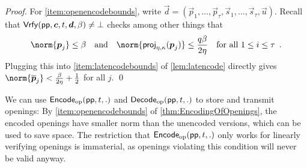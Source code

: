 \begin{proof}
\bigskip\noindent
For \autoref{item:openencodebounds}, write $\vec{d} = (\vec{p}_1,\ldots,\vec{p}_\tau,\vec{s}_1,\ldots, \vec{s}_\tau,\vec{u})$.
Recall that $\mathsf{Vrfy}(\mathsf{pp}, \boldsymbol{c},t,\boldsymbol{d},\beta) \neq \bot$ checks among other things that
\[
 \norm{\vec{p}_j} \leq \beta \quad\text{and}\quad \norm{\projring(\vec{p}_j)}\leq \frac{q\beta}{2\eta} \quad\text{for all $1\leq i \leq \tau$}\enspace.
\]
Plugging this into \autoref{item:latencodebounds} of \autoref{lem:latencode} directly gives $\norm{\overline{\vec{p}}_j} < \frac{\beta}{2\eta}+\frac12$ for all $j$.
\qed
\end{proof}

We can use $\mathsf{Encode}_{\mathrm{op}}(\mathsf{pp}, t, .)$ and $\mathsf{Decode}_{\mathrm{op}}(\mathsf{pp}, t, .)$ to store and transmit openings:
By \autoref{item:openencodebounds} of \autoref{thm:EncodingOfOpenings}, the encoded openings have smaller norm than the unencoded versions, which can be used to save space.
The restriction that $\mathsf{Encode}_{\mathrm{op}}(\mathsf{pp}, t, .)$ only works for linearly verifying openings is immaterial, as openings violating this condition will never be valid anyway.

